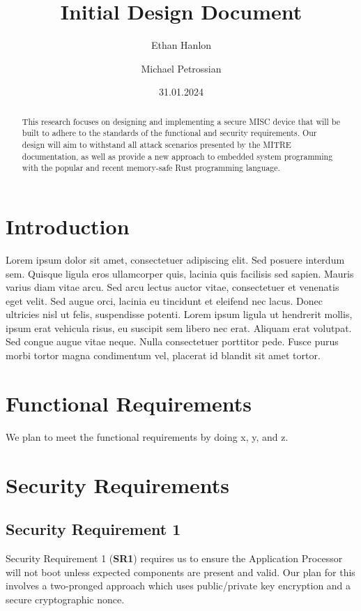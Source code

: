 \documentclass{prace}
\title{Initial Design Document}
\date{31.01.2024}
\author[1]{Ethan Hanlon}
\author[1]{Michael Petrossian}
\affiliation{San Francisco State University, 1600 Holloway Avenue, San Francisco, CA 94132, USA}
\begin{document}
\maketitle

\begin{abstract}
This research focuses on designing and implementing a secure MISC device that will be built to adhere to the standards of the functional and security requirements. Our design will 
aim to withstand all attack scenarios presented by the MITRE documentation, as well as provide a new approach to embedded system programming with the popular and recent memory-safe Rust programming language. 
\end{abstract}

\section{Introduction}

Lorem ipsum dolor sit amet, consectetuer adipiscing elit. Sed posuere interdum
sem. Quisque ligula eros ullamcorper quis, lacinia quis facilisis sed sapien.
Mauris varius diam vitae arcu. Sed arcu lectus auctor vitae, consectetuer et
venenatis eget velit. Sed augue orci, lacinia eu tincidunt et eleifend nec
lacus. Donec ultricies nisl ut felis, suspendisse potenti. Lorem ipsum ligula
ut hendrerit mollis, ipsum erat vehicula risus, eu suscipit sem libero nec
erat. Aliquam erat volutpat. Sed congue augue vitae neque. Nulla consectetuer
porttitor pede. Fusce purus morbi tortor magna condimentum vel, placerat id
blandit sit amet tortor.


\section{Functional Requirements}

We plan to meet the functional requirements by doing x, y, and z.

\section{Security Requirements}

\subsection{Security Requirement 1}
Security Requirement 1 (\textbf{SR1}) requires us to ensure the Application Processor will not boot unless
expected components are present and valid. Our plan for this involves a two-pronged approach
which uses public/private key encryption and a secure cryptographic nonce.
\end{document}
